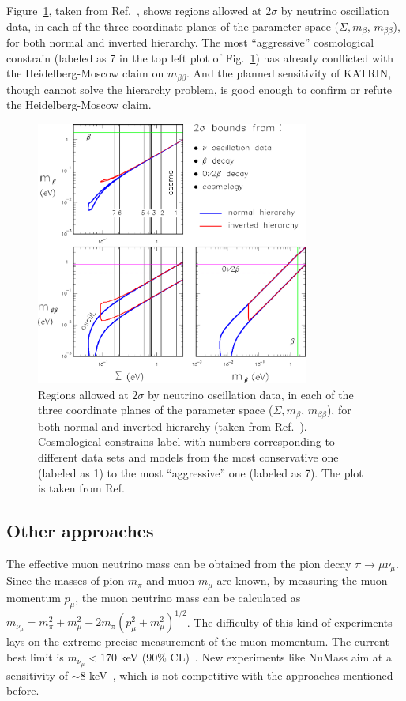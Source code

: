 Figure~\ref{fig:sum1b2b}, taken from Ref.~\cite{Fog07}, shows regions allowed at $2\sigma$ by neutrino oscillation data, in each of the three coordinate planes of the parameter space ($\Sigma, m_{\beta}$, $m_{\beta\beta}$), for both normal and inverted hierarchy. The most ``aggressive'' cosmological constrain (labeled as 7 in the top left plot of Fig.~\ref{fig:sum1b2b}) has already conflicted with the Heidelberg-Moscow claim on $m_{\beta\beta}$. And the planned sensitivity of KATRIN, though cannot solve the hierarchy problem, is good enough to confirm or refute the Heidelberg-Moscow claim.
\begin{figure}[tbhp]
  \centering
  \includegraphics[width=0.8\textwidth]{sum1b2b.eps}  
  \caption{Regions allowed at $2\sigma$ by neutrino oscillation data,     in each of the three coordinate planes of the parameter space     ($\Sigma, m_{\beta}$, $m_{\beta\beta}$), for both normal and     inverted hierarchy (taken from Ref.~\cite{Fog07}). Cosmological     constrains label with numbers corresponding to different data sets     and models from the most conservative one (labeled as 1) to the     most ``aggressive'' one (labeled as 7). The plot is taken from     Ref.}
  \label{fig:sum1b2b}
\end{figure}

\subsection{Other approaches}
\label{sec:otap}
The effective muon neutrino mass can be obtained from the pion decay $\pi \rightarrow \mu \nu_{\mu}$. Since the masses of pion $m_{\pi}$ and muon $m_{\mu}$ are known, by measuring the muon momentum $p_{\mu}$, the muon neutrino mass can be calculated as $m_{\nu_{\mu}} = m^{2}_{\pi} + m^{2}_{\mu} - 2m_{\pi} (p^{2}_{\mu} + m^{2}_{\mu})^{1/2}$. The difficulty of this kind of experiments lays on the extreme precise measurement of the muon momentum. The current best limit is $m_{\nu_{\mu}} < 170$ keV (90\% CL)~\cite{Ass96}. New experiments like NuMass aim at a sensitivity of $\sim 8$ keV~\cite{Num20}, which is not competitive with the approaches mentioned before.

